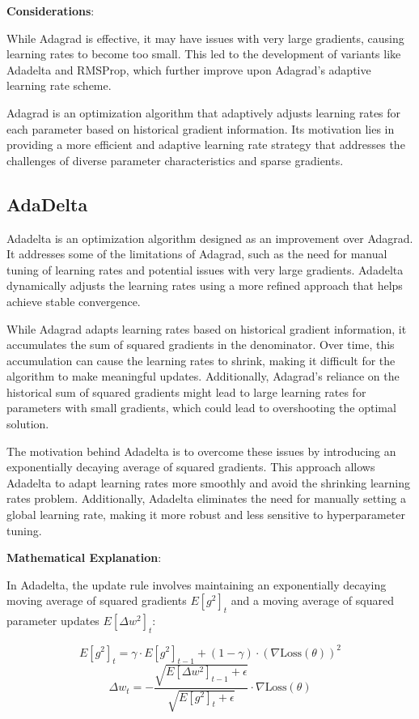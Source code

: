\documentclass{report}
\begin{document}
\textbf{Considerations}:

While Adagrad is effective, it may have issues with very large gradients, causing learning rates to become too small. This led to the development of variants like Adadelta and RMSProp, which further improve upon Adagrad's adaptive learning rate scheme.

Adagrad is an optimization algorithm that adaptively adjusts learning rates for each parameter based on historical gradient information. Its motivation lies in providing a more efficient and adaptive learning rate strategy that addresses the challenges of diverse parameter characteristics and sparse gradients.

\subsection{AdaDelta}
Adadelta is an optimization algorithm designed as an improvement over Adagrad. It addresses some of the limitations of Adagrad, such as the need for manual tuning of learning rates and potential issues with very large gradients. Adadelta dynamically adjusts the learning rates using a more refined approach that helps achieve stable convergence.

While Adagrad adapts learning rates based on historical gradient information, it accumulates the sum of squared gradients in the denominator. Over time, this accumulation can cause the learning rates to shrink, making it difficult for the algorithm to make meaningful updates. Additionally, Adagrad's reliance on the historical sum of squared gradients might lead to large learning rates for parameters with small gradients, which could lead to overshooting the optimal solution.

The motivation behind Adadelta is to overcome these issues by introducing an exponentially decaying average of squared gradients. This approach allows Adadelta to adapt learning rates more smoothly and avoid the shrinking learning rates problem. Additionally, Adadelta eliminates the need for manually setting a global learning rate, making it more robust and less sensitive to hyperparameter tuning.

\textbf{Mathematical Explanation}:

In Adadelta, the update rule involves maintaining an exponentially decaying moving average of squared gradients \(E[g^2]_t\) and a moving average of squared parameter updates \(E[\Delta w^2]_t\):

\[ E[g^2]_t = \gamma \cdot E[g^2]_{t-1} + (1 - \gamma) \cdot (\nabla \text{Loss}(\theta))^2 \]
\[ \Delta w_t = - \frac{\sqrt{E[\Delta w^2]_{t-1} + \epsilon}}{\sqrt{E[g^2]_t + \epsilon}} \cdot \nabla \text{Loss}(\theta) \]
\end{document}
